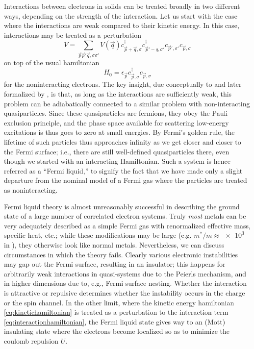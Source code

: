 Interactions between electrons in solids can be treated broadly in two different ways, depending on the strength of the interaction.
Let us start with the case where the interactions are weak compared to their kinetic energy.
In this case, interactions may be treated as a perturbation
\begin{equation}\label{eq:interactionhamiltonian}
V = \sum_{\vec{p}\vec{p}'\vec{q},\sigma\sigma'}V(\vec{q})c^\dagger_{\vec{p}+\vec{q},\sigma}c^\dagger_{\vec{p}'-q,\sigma'}c_{\vec{p}',\sigma'}c_{\vec{p},\sigma}
\end{equation}
on top of the usual hamiltonian
\begin{equation}\label{eq:kinetichamiltonian}
H_0 = \epsilon_{\vec{p}} c^\dagger_{\vec{p},\sigma}c_{\vec{p},\sigma}
\end{equation}
for the noninteracting electrons.
The key insight, due conceptually to \citet{landau} and later formalized by \citet{gell-mann}, is that, as long as the interactions are sufficiently weak, this problem can be adiabatically connected to a similar problem with non-interacting quasiparticles.
Since these quasiparticles are fermions, they obey the Pauli exclusion principle, and the phase space available for scattering low-energy excitations is thus goes to zero at small energies.
By Fermi's golden rule, the lifetime of such particles thus approaches infinity as we get closer and closer to the Fermi surface; i.e., there are still well-defined quasiparticles there, even though we started with an interacting Hamiltonian.
Such a system is hence referred as a ``Fermi liquid,'' to signify the fact that we have made only a slight departure from the nominal model of a Fermi gas where the particles are treated as noninteracting.

Fermi liquid theory is almost unreasonably successful in describing the ground state of a large number of correlated electron systems.
Truly \emph{most} metals can be very adequately described as a simple Fermi gas with renormalized effective mass, specific heat, etc.; while these modifications may be large (e.g. $m^*/m\approx\num{e3}$ in ), they otherwise look like normal metals.
Nevertheless, we can discuss circumstances in which the theory fails.
Clearly various electronic instabilities may gap out the Fermi surface, resulting in an insulator; this happens for arbitrarily weak interactions in quasi-\oned systems due to the Peierls mechanism, and in higher dimensions due to, e.g., Fermi surface nesting.
Whether the interaction is attractive or repulsive determines whether the instability occurs in the charge or the spin channel.
In the other limit, where the kinetic energy hamiltonian \ref{eq:kinetichamiltonian} is treated as a perturbation to the interaction term \ref{eq:interactionhamiltonian}, the Fermi liquid state gives way to an (Mott) insulating state where the electrons become localized so as to minimize the coulomb repulsion $U$.

